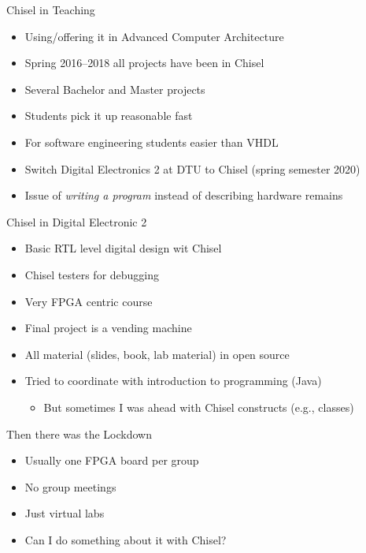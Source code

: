 \begin{frame}[fragile]{Chisel in Teaching}
\begin{itemize}
\item Using/offering it in Advanced Computer Architecture
\item Spring 2016--2018 all projects have been in Chisel
\item Several Bachelor and Master projects
\item Students pick it up reasonable fast
\item For software engineering students easier than VHDL
\item Switch Digital Electronics 2 at DTU to Chisel (spring semester 2020)
\item Issue of \emph{writing a program} instead of describing hardware remains
\end{itemize}
\end{frame}

\begin{frame}[fragile]{Chisel in Digital Electronic 2}
\begin{itemize}
\item Basic RTL level digital design wit Chisel
\item Chisel testers for debugging
\item Very FPGA centric course
\item Final project is a vending machine
\item All material (slides, book, lab material) in open source
\item Tried to coordinate with introduction to programming (Java)
\begin{itemize}
\item But sometimes I was ahead with Chisel constructs (e.g., classes)
\end{itemize}
\end{itemize}
\end{frame}

\begin{frame}[fragile]{Then there was the Lockdown}
\begin{itemize}
\item Usually one FPGA board per group
\item No group meetings
\item Just virtual labs
\item Can I do something about it with Chisel?
\end{itemize}
\end{frame}

